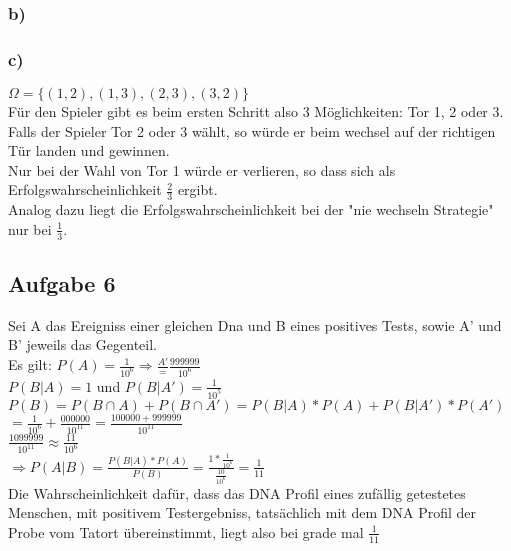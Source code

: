 \documentclass[11pt]{amsart}
\begin{document}
\subsubsection*{b)}



\subsubsection*{c)}

$\Omega = \{(1,2),(1,3),(2,3),(3,2)\}$ \\
Für den Spieler gibt es beim ersten Schritt also 3 Möglichkeiten: Tor 1, 2 oder 3. \\ 
Falls der Spieler Tor 2 oder 3 wählt, so würde er beim wechsel auf der richtigen Tür landen und gewinnen. \\
Nur bei der Wahl von Tor 1 würde er verlieren, so dass sich als Erfolgswahrscheinlichkeit $\frac{2}{3}$ ergibt. \\
Analog dazu liegt die Erfolgswahrscheinlichkeit bei der "nie wechseln Strategie" nur bei $\frac{1}{3}$.

\subsection*{Aufgabe 6}

Sei A das Ereigniss einer gleichen Dna und B eines positives Tests, sowie A' und B' jeweils das Gegenteil.\\
Es gilt: $P(A) = \frac{1}{10^6} \Rightarrow \frac{A'} = \frac{999999}{10^6}$ \\
$P(B | A) = 1$ und $P(B | A') = \frac{1}{10^5}$ \\
$P(B) = P(B \cap A) + P(B \cap A') = P(B|A) * P(A) + P(B|A') * P(A')$ \\
$= \frac{1}{10^6} + \frac{000000}{10^{11}} = \frac{100000 + 999999}{10^{11}}$ \\
$\frac{1099999}{10^{11}} \approx \frac{11}{10^6}$ \\ 
$\Rightarrow P(A | B) = \frac{P(B|A) * P(A)}{P(B)} = \frac{1 * \frac{1}{10^6}}{\frac{10}{10^6}} = \frac{1}{11}$ \\
Die Wahrscheinlichkeit dafür, dass das DNA Profil eines zufällig getestetes Menschen, mit positivem Testergebniss, 
tatsächlich mit dem DNA Profil der Probe vom Tatort übereinstimmt, liegt also bei grade mal $\frac{1}{11}$ \\
\end{document}
